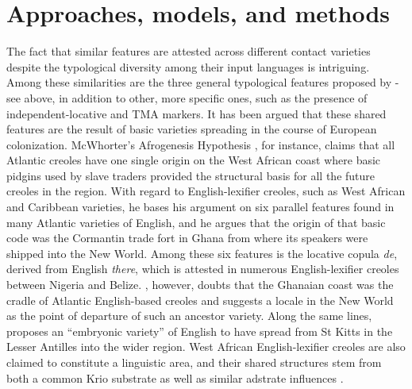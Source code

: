 \documentclass[output=paper,
modfonts
]{langscibook}
\begin{document}
\section{Approaches, models, and methods} \label{approaches}

The fact that similar features are attested across different contact varieties despite the typological diversity among their input languages is intriguing. Among these similarities are the three general typological features proposed by \cite{mcworther1998identifying} - see above, in addition to other, more specific ones, such as the presence of independent-locative and TMA markers. It has been argued that these shared features are the result of basic varieties spreading in the course of European colonization. McWhorter’s Afrogenesis Hypothesis \citep{mcworther2000missing}, for instance, claims that all Atlantic creoles have one single origin on the West African coast where basic pidgins used by slave traders provided the structural basis for all the future creoles in the region. With regard to English-lexifier creoles, such as West African and Caribbean varieties, he bases his argument on six parallel features found in many Atlantic varieties of English, and he argues that the origin of that basic code was the Cormantin trade fort in Ghana from where its speakers were shipped into the New World. Among these six features is the locative copula \emph{de}, derived from English \emph{there}, which is attested in numerous English-lexifier creoles between Nigeria and Belize. \cite{huber1999atlantic}, however, doubts that the Ghanaian coast was the cradle of Atlantic English-based creoles and suggests a locale in the New World as the point of departure of such an ancestor variety. Along the same lines, \cite{baker1999investigating} proposes an “embryonic variety” of English to have spread from St Kitts in the Lesser Antilles into the wider region. West African English-lexifier creoles are also claimed to constitute a linguistic area, and their shared structures stem from both a common Krio substrate as well as similar adstrate influences \citep{yakpo2017towards}.
\end{document}
